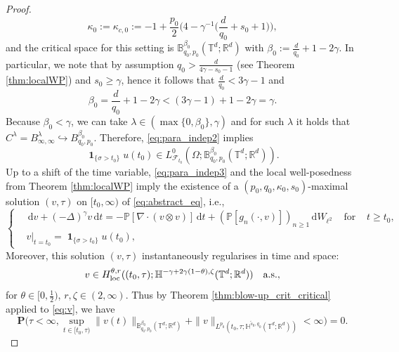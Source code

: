 \documentclass[11pt, a4paper,oneside, reqno]{amsart}
\theoremstyle{remark} %
\theoremstyle{definition} %
\numberwithin{theorem}{section}
\numberwithin{equation}{section}
\renewcommand{\P}{{\mathbb P}}
\newcommand{\T}{\mathbb{T}}
\newcommand{\Hs}{\mathbb{H}}
\newcommand{\RR}{\mathbb{R}}
\newcommand{\BB}{\mathbb{B}}
\newcommand{\half}{\frac{1}{2}}
\newcommand{\RRd}{\RR^d}
\newcommand{\del}{\Delta}
\newcommand{\grad}{\nabla}
\newcommand{\gam}{\gamma}
\newcommand{\loc}{{\rm loc}}
\renewcommand{\tilde}[1]{\widetilde{#1}}
\newcommand{\dd}{\hspace{2pt}\mathrm{d}}
\DeclareMathOperator{\ind}{\mathbf{1}}
\begin{document}
\begin{proof}
\begin{equation}
    \kappa_0:= \kappa_{c,0}:= -1  + \frac{p_0}{2}\big(4-\gam^{-1}\big(\frac{d}{q_0}+s_0+1\big)\big),
\end{equation}
and the critical space for this setting is $\BB^{\beta_0}_{q_0,p_0}(\T^d;\RRd)$ with $\beta_0:=\frac{d}{q_0}+1-2\gam$. In particular, we note that by assumption $q_0> \frac{d}{4\gam-s_0-1}$ (see Theorem \ref{thm:localWP}) and $s_0\geq \gam$, hence it follows that
$\frac{d}{q_0}< 3\gam-1$ and 
\begin{equation}\label{eq:beta0}
    \beta_0 = \frac{d}{q_0}+1-2\gam< (3\gam-1)+1-2\gam = \gam.
\end{equation}
Because $\beta_0<\gam$, we can take $\lambda\in (\max\{0, \beta_0\}, \gam)$ and for such $\lambda$ it holds that $C^\lambda=B^\lambda_{\infty,\infty}\hookrightarrow B^{\beta_0}_{q_0, p_0}$. Therefore, \eqref{eq:para_indep2} implies 
\begin{equation}\label{eq:para_indep3}
    \ind_{\{\sigma>t_0\}}u(t_0)\in L^0_{\mathcal{F}_{t_0}}(\Omega; \BB^{\beta_0}_{q_0, p_0}(\T^d; \RR^d)).
\end{equation}
Up to a shift of the time variable, \eqref{eq:para_indep3} and the local well-posedness from Theorem \ref{thm:localWP} imply the existence of a $(p_0,q_0, \kappa_0, s_0)$-maximal solution $(v, \tau)$ on $[t_0, \infty)$ of \eqref{eq:abstract_eq}, i.e.,
    \begin{equation}\label{eq:v}
       \left\{
        \begin{aligned}
            &\dd v + (-\del)^\gam v \dd t = -\P [\grad \cdot (v\otimes v)]\dd t + (\P[g_n(\cdot, v)])_{n\geq1}\dd W_{\ell^2}&\text{ for }&t\geq t_0,\\
            &v|_{t=t_0}=\ind_{\{\sigma>t_0\}}u(t_0),
        \end{aligned}
        \right.
\end{equation}
Moreover, this solution $(v,\tau)$ instantaneously regularises in time and space:
     \begin{equation}\label{eq:instan_v}
    v\in H^{\theta,r}_\loc((t_0,\tau); \Hs^{-\gam+2\gam(1-\theta),\zeta}(\T^d;\RRd)) \quad \text{a.s.},
\end{equation}
for $\theta \in [0,\half)$,  $r,\zeta\in (2,\infty)$. Thus by Theorem \ref{thm:blow-up_crit_critical} applied to \eqref{eq:v}, we have
\begin{equation}\label{eq:para_indep4}
    \mathbf{P}\big(\tau < \infty,\sup\limits_{t \in [t_0, \tau)} \|v(t)\|_{{\BB^{\beta_0}_{q_0,p_0}(\T^d;\RR^d)}}+\|v\|_{L^{p_0}(t_0, \tau; \Hs^{\tilde{s}_0,q_0}(\T^d;\RR^d))}<\infty\big) = 0.

\end{equation}
\end{proof}
\end{document}
